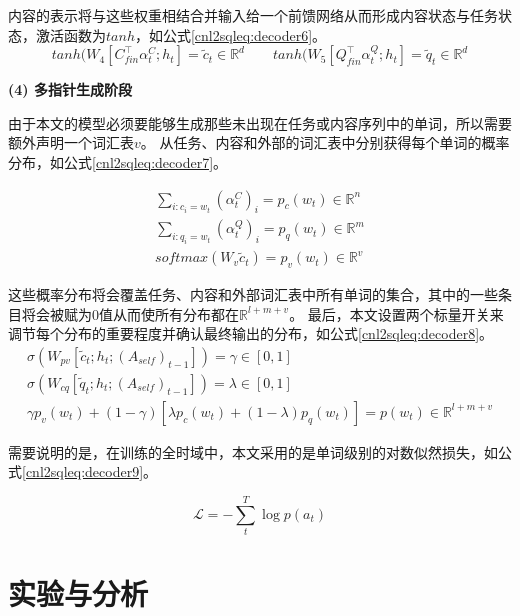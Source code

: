 
内容的表示将与这些权重相结合并输入给一个前馈网络从而形成内容状态与任务状态，激活函数为$tanh$，如公式\ref{cnl2sqleq:decoder6}。
\begin{equation}
  \label{cnl2sqleq:decoder6}
  tanh(W_4[C^{\top}_{fin}\alpha^C_t;h_t] = \widetilde{c}_{t} \in \mathbb{R}^{d} \qquad tanh(W_5[Q^{\top}_{fin}\alpha^Q_t;h_t] = \widetilde{q}_{t} \in \mathbb{R}^{d}
\end{equation}

\textbf{(4) 多指针生成阶段}

由于本文的模型必须要能够生成那些未出现在任务或内容序列中的单词，所以需要额外声明一个词汇表$v$。
从任务、内容和外部的词汇表中分别获得每个单词的概率分布，如公式\ref{cnl2sqleq:decoder7}。

\begin{gather}
  \label{cnl2sqleq:decoder7}
  \sum_{i:c_i=w_t} (\alpha^C_t)_i = p_c(w_t) \in \mathbb{R}^{n}\\
  \sum_{i:q_i=w_t} (\alpha^Q_t)_i = p_q(w_t) \in \mathbb{R}^{m}\\
  softmax(W_v\widetilde{c}_t) = p_v(w_t) \in \mathbb{R}^{v}
\end{gather}

这些概率分布将会覆盖任务、内容和外部词汇表中所有单词的集合，其中的一些条目将会被赋为0值从而使所有分布都在$\mathbb{R}^{l+m+v}$。
最后，本文设置两个标量开关来调节每个分布的重要程度并确认最终输出的分布，如公式\ref{cnl2sqleq:decoder8}。
\begin{gather}
  \label{cnl2sqleq:decoder8}
  \sigma (W_{pv}[\widetilde{c}_t;h_t;(A_{self})_{t-1}]) = \gamma \in [0,1]\\
  \sigma (W_{cq}[\widetilde{q}_t;h_t;(A_{self})_{t-1}]) = \lambda \in [0,1]\\
  \gamma p_v(w_t) + (1 - \gamma)[\lambda p_c(w_t) + (1 - \lambda)p_q(w_t)] = p(w_t) \in \mathbb{R}^{l+m+v}
\end{gather}

需要说明的是，在训练的全时域中，本文采用的是单词级别的对数似然损失，如公式\ref{cnl2sqleq:decoder9}。

\begin{equation}
  \label{cnl2sqleq:decoder9}
  \mathcal L = -\sum^T_t \log p(a_t)
\end{equation}


\section{实验与分析}
\label{cnl2sql:syyfx}
